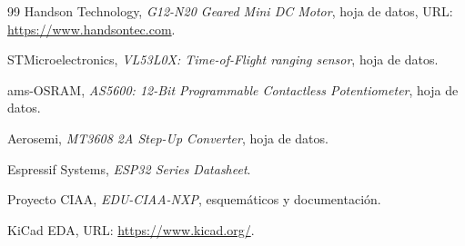 \documentclass[12pt,a4paper]{article}
\begin{document}
\begin{thebibliography}{99}
Handson Technology, \textit{G12-N20 Geared Mini DC Motor}, hoja de datos, URL: \url{https://www.handsontec.com}.

STMicroelectronics, \textit{VL53L0X: Time-of-Flight ranging sensor}, hoja de datos.

ams-OSRAM, \textit{AS5600: 12-Bit Programmable Contactless Potentiometer}, hoja de datos.

Aerosemi, \textit{MT3608 2A Step-Up Converter}, hoja de datos.

Espressif Systems, \textit{ESP32 Series Datasheet}.

Proyecto CIAA, \textit{EDU-CIAA-NXP}, esquemáticos y documentación.

KiCad EDA, URL: \url{https://www.kicad.org/}.

\end{thebibliography}
\end{document}
